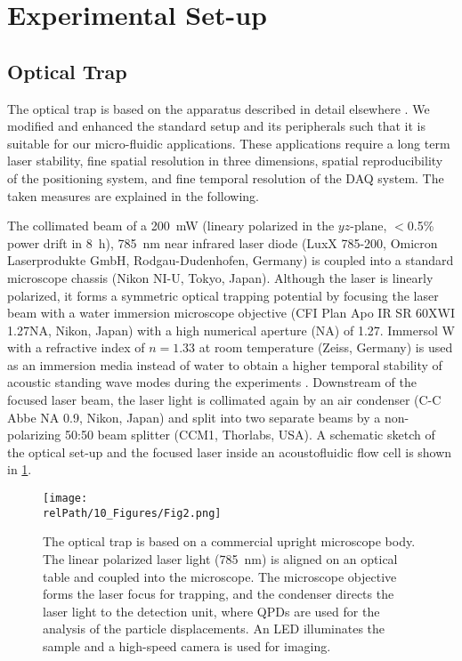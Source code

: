 \section{Experimental Set-up\label{sec:VT-experimentalSetUp}}
\subsection{Optical Trap\label{sec:VT-opticalTrap}}

The optical trap is based on the apparatus described in detail elsewhere 
\cite{Bodensiek2013}. We modified and enhanced the standard setup and its 
peripherals such that it is suitable for our micro-fluidic applications. These 
applications require a long term laser stability, fine spatial resolution in 
three dimensions, spatial reproducibility of the positioning system, and fine 
temporal resolution of the DAQ system. The taken measures are explained in the 
following.

The collimated beam of a \SI{200}{\milli\watt} (lineary polarized in the 
$yz$-plane, $<$0.5\% power drift in \SI{8}{\hour}), \SI{785}{\nano\meter} near 
infrared laser diode (LuxX 785-200, Omicron Laserprodukte GmbH, 
Rodgau-Dudenhofen, Germany) is coupled into a standard microscope chassis (Nikon 
NI-U, Tokyo, Japan).  Although the laser is linearly polarized, it forms a 
symmetric optical trapping potential by focusing the laser beam with a water 
immersion microscope objective (CFI Plan Apo IR SR 60XWI 1.27NA, Nikon, Japan) 
with a high numerical aperture (NA) of 1.27. Immersol W with a refractive index 
of $n=1.33$ at room temperature (Zeiss, Germany) is used as an immersion media 
instead of water to obtain a higher temporal stability of acoustic standing wave 
modes during the experiments \cite{Lamprecht2016}.  Downstream of the focused 
laser beam, the laser light is collimated again by an air condenser (C-C Abbe NA 
0.9, Nikon, Japan) and split into two separate beams by a non-polarizing 50:50 
beam splitter (CCM1, Thorlabs, USA). A schematic sketch of the optical set-up 
and the focused laser inside an acoustofluidic flow cell is shown in 
\cref{fig:VT-Fig2}.

\begin{figure}[tb]
    \centering
    \texttt{[image: \\relPath/10\_Figures/Fig2.png]}
    \caption{The optical trap is based on a commercial upright microscope body.  
        The linear polarized laser light (\SI{785}{\nano\meter}) is aligned on 
        an optical table and coupled into the microscope. The microscope 
        objective forms the laser focus for trapping, and the condenser directs 
    the laser light to the detection unit, where QPDs are used for the analysis 
  of the particle displacements. An LED illuminates the sample and a high-speed 
camera is used for imaging.\label{fig:VT-Fig2}}
\end{figure}%

